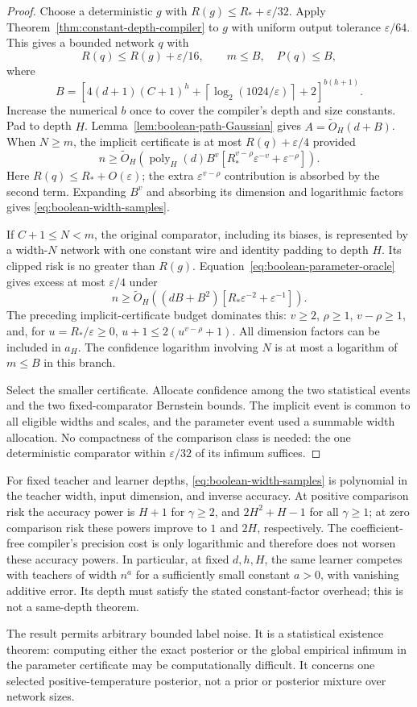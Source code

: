 \begin{proof}
Choose a deterministic $g$ with $R(g)\le R_*+\varepsilon/32$. Apply Theorem~\ref{thm:constant-depth-compiler} to $g$ with uniform output tolerance $\varepsilon/64$. This gives a bounded network $q$ with
\[
 R(q)\le R(g)+\varepsilon/16,\qquad
 m\le B,\quad P(q)\le B,
\]
where
\[
 B=\left[4(d+1)(C+1)^h+
              \left\lceil\log_2(1024/\varepsilon)\right\rceil+2\right]^{b(h+1)}.
\]
Increase the numerical $b$ once to cover the compiler's depth and size constants. Pad to depth $H$. Lemma~\ref{lem:boolean-path-Gaussian} gives $A=\widetilde O_H(d+B)$. When $N\ge m$, the implicit certificate is at most $R(q)+\varepsilon/4$ provided
\[
 n\ge\widetilde O_H\left(\operatorname{poly}_H(d)B^v
       [R_*^{v-\rho}\varepsilon^{-v}+\varepsilon^{-\rho}]\right).
\]
Here $R(q)\le R_*+O(\varepsilon)$; the extra $\varepsilon^{v-\rho}$ contribution is absorbed by the second term. Expanding $B^v$ and absorbing its dimension and logarithmic factors gives \eqref{eq:boolean-width-samples}.

If $C+1\le N<m$, the original comparator, including its biases, is represented by a width-$N$ network with one constant wire and identity padding to depth $H$. Its clipped risk is no greater than $R(g)$. Equation~\eqref{eq:boolean-parameter-oracle} gives excess at most $\varepsilon/4$ under
\[
 n\ge\widetilde O_H\left((dB+B^2)
                    [R_*\varepsilon^{-2}+\varepsilon^{-1}]\right).
\]
The preceding implicit-certificate budget dominates this: $v\ge2$, $\rho\ge1$, $v-\rho\ge1$, and, for $u=R_*/\varepsilon\ge0$,
$u+1\le2(u^{v-\rho}+1)$.
All dimension factors can be included in $a_H$. The confidence logarithm involving $N$ is at most a logarithm of $m\le B$ in this branch.

Select the smaller certificate. Allocate confidence among the two statistical events and the two fixed-comparator Bernstein bounds. The implicit event is common to all eligible widths and scales, and the parameter event used a summable width allocation. No compactness of the comparison class is needed: the one deterministic comparator within $\varepsilon/32$ of its infimum suffices.
\end{proof}

For fixed teacher and learner depths, \eqref{eq:boolean-width-samples} is polynomial in the teacher width, input dimension, and inverse accuracy. At positive comparison risk the accuracy power is $H+1$ for $\gamma\ge2$, and $2H^2+H-1$ for all $\gamma\ge1$; at zero comparison risk these powers improve to $1$ and $2H$, respectively. The coefficient-free compiler's precision cost is only logarithmic and therefore does not worsen these accuracy powers. In particular, at fixed $d,h,H$, the same learner competes with teachers of width $n^a$ for a sufficiently small constant $a>0$, with vanishing additive error. Its depth must satisfy the stated constant-factor overhead; this is not a same-depth theorem.

The result permits arbitrary bounded label noise. It is a statistical existence theorem: computing either the exact posterior or the global empirical infimum in the parameter certificate may be computationally difficult. It concerns one selected positive-temperature posterior, not a prior or posterior mixture over network sizes.
